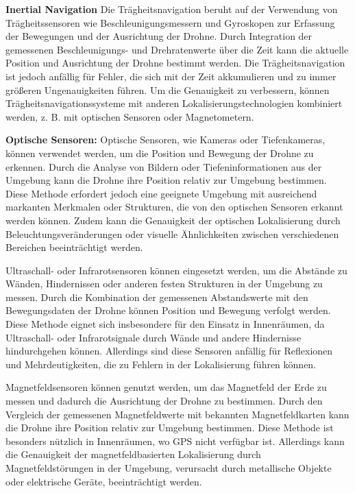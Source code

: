 \begin{description} \label{lst:navigation-types}
    \item \textbf{Inertial Navigation} Die Trägheitsnavigation beruht auf der Verwendung von Trägheitssensoren wie Beschleunigungsmessern und Gyroskopen zur Erfassung der Bewegungen und der Ausrichtung der Drohne. Durch Integration der gemessenen Beschleunigungs- und Drehratenwerte über die Zeit kann die aktuelle Position und Ausrichtung der Drohne bestimmt werden. Die Trägheitsnavigation ist jedoch anfällig für Fehler, die sich mit der Zeit akkumulieren und zu immer größeren Ungenauigkeiten führen. Um die Genauigkeit zu verbessern, können Trägheitsnavigationssysteme mit anderen Lokalisierungstechnologien kombiniert werden, z. B. mit optischen Sensoren oder Magnetometern.

    \item \textbf{Optische Sensoren:} Optische Sensoren, wie Kameras oder Tiefenkameras, können verwendet werden, um die Position und Bewegung der Drohne zu erkennen. Durch die Analyse von Bildern oder Tiefeninformationen aus der Umgebung kann die Drohne ihre Position relativ zur Umgebung bestimmen. Diese Methode erfordert jedoch eine geeignete Umgebung mit ausreichend markanten Merkmalen oder Strukturen, die von den optischen Sensoren erkannt werden können. Zudem kann die Genauigkeit der optischen Lokalisierung durch Beleuchtungsveränderungen oder visuelle Ähnlichkeiten zwischen verschiedenen Bereichen beeinträchtigt werden.

    \item [\textbf{Ultraschall- oder Infrarotsensoren:}] Ultraschall- oder Infrarotsensoren können eingesetzt werden, um die Abstände zu Wänden, Hindernissen oder anderen festen Strukturen in der Umgebung zu messen. Durch die Kombination der gemessenen Abstandswerte mit den Bewegungsdaten der Drohne können Position und Bewegung verfolgt werden. Diese Methode eignet sich insbesondere für den Einsatz in Innenräumen, da Ultraschall- oder Infrarotsignale durch Wände und andere Hindernisse hindurchgehen können. Allerdings sind diese Sensoren anfällig für Reflexionen und Mehrdeutigkeiten, die zu Fehlern in der Lokalisierung führen können.

    \item [\textbf{Magnetfeldsensoren:}] Magnetfeldsensoren können genutzt werden, um das Magnetfeld der Erde zu messen und dadurch die Ausrichtung der Drohne zu bestimmen. Durch den Vergleich der gemessenen Magnetfeldwerte mit bekannten Magnetfeldkarten kann die Drohne ihre Position relativ zur Umgebung bestimmen. Diese Methode ist besonders nützlich in Innenräumen, wo \ac{GPS} nicht verfügbar ist. Allerdings kann die Genauigkeit der magnetfeldbasierten Lokalisierung durch Magnetfeldstörungen in der Umgebung, verursacht durch metallische Objekte oder elektrische Geräte, beeinträchtigt werden.


\end{description}
